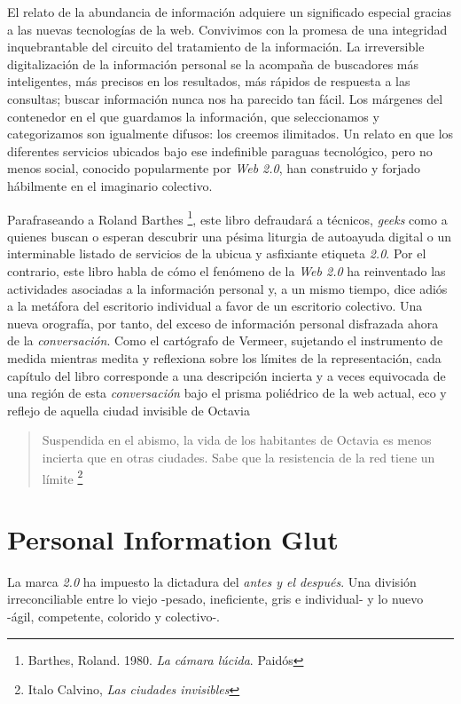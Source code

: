 \documentclass[12pt, a4paper,twoside]{book}
\newcommand{\chap}[1]{\newpage\thispagestyle{empty}\chapter{#1}\label{chap:\thechapter}}
\begin{document}
El relato de la abundancia de información adquiere un significado
especial gracias a las nuevas tecnologías de la web. Convivimos con
la promesa de una integridad inquebrantable del circuito del
tratamiento de la información. La irreversible digitalización de la
información personal se la acompaña de buscadores más inteligentes,
más precisos en los resultados, más rápidos de respuesta a las
consultas; buscar información nunca nos ha parecido tan fácil. Los
márgenes del contenedor en el que guardamos la información, que
seleccionamos y categorizamos son igualmente difusos: los creemos
ilimitados. Un relato en que los diferentes servicios ubicados bajo
ese indefinible paraguas tecnológico, pero no menos social,
conocido popularmente por \emph{Web 2.0}, han construido y forjado
hábilmente en el imaginario colectivo.

Parafraseando a Roland Barthes%
\footnote{Barthes, Roland. 1980. \emph{La cámara lúcida}. Paidós},
este libro defraudará a técnicos, \emph{geeks} como a quienes
buscan o esperan descubrir una pésima liturgia de autoayuda digital
o un interminable listado de servicios de la ubicua y asfixiante
etiqueta \emph{2.0}. Por el contrario, este libro habla de cómo el
fenómeno de la \emph{Web 2.0} ha reinventado las actividades
asociadas a la información personal y, a un mismo tiempo, dice
adiós a la metáfora del escritorio individual a favor de un
escritorio colectivo. Una nueva orografía, por tanto, del exceso de
información personal disfrazada ahora de la \emph{conversación}.
Como el cartógrafo de Vermeer, sujetando el instrumento de medida
mientras medita y reflexiona sobre los límites de la
representación, cada capítulo del libro corresponde a una
descripción incierta y a veces equivocada de una región de esta
\emph{conversación} bajo el prisma poliédrico de la web actual, eco
y reflejo de aquella ciudad invisible de Octavia

\begin{quote}
Suspendida en el abismo, la vida de los habitantes de Octavia es
menos incierta que en otras ciudades. Sabe que la resistencia de la
red tiene un límite%
\footnote{Italo Calvino, \emph{Las ciudades invisibles}}

\end{quote}
\chap{Personal Information Glut}

La marca \emph{2.0} ha impuesto la dictadura del
\emph{antes y el después}. Una división irreconciliable entre lo
viejo -pesado, ineficiente, gris e individual- y lo nuevo -ágil,
competente, colorido y colectivo-.
\end{document}
